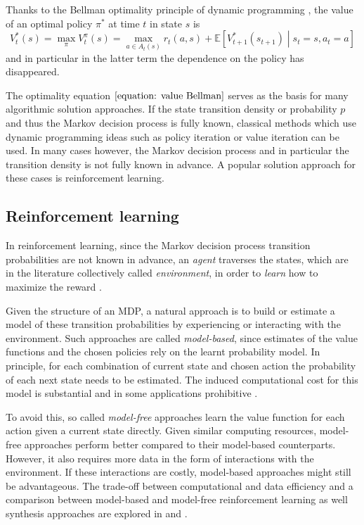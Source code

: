 \documentclass[a4paper,12pt]{article}
\newcommand{\E}{\mathbb{E}}
\begin{document}
Thanks to the Bellman optimality principle of dynamic programming \cite{sutton2018reinforcement}, the value of an optimal policy $\pi^*$ at time $t$ in state $s$ is 
\begin{equation}
    V^*_t(s) = \max_\pi V^\pi_t(s) = \max_{a\in A_t(s)} r_t(a, s) + \E \left[ V^*_{t+1}(s_{t+1}) \middle| s_t = s, a_t = a \right]
    \label{equation: value Bellman}
\end{equation}
and in particular in the latter term the dependence on the policy has disappeared.

The optimality equation $\eqref{equation: value Bellman}$ serves as the basis for many algorithmic solution approaches. If the state transition density or probability $p$ and thus the Markov decision process is fully known, classical methods which use dynamic programming ideas such as policy iteration or value iteration can be used. In many cases however, the Markov decision process and in particular the transition density is not fully known in advance. A popular solution approach for these cases is reinforcement learning.


\subsection{Reinforcement learning}
In reinforcement learning, since the Markov decision process transition probabilities are not known in advance, an \emph{agent} traverses the states, which are in the literature collectively called \emph{environment}, in order to \emph{learn} how to maximize the reward \cite{sutton2018reinforcement}.

Given the structure of an MDP, a natural approach is to build or estimate a model of these transition probabilities by experiencing or interacting with the environment. Such approaches are called \emph{model-based}, since estimates of the value functions and the chosen policies rely on the learnt probability model. In principle, for each combination of current state and chosen action the probability of each next state needs to be estimated. The induced computational cost for this model is substantial and in some applications prohibitive \cite{asadi2016strengths}.

To avoid this, so called \emph{model-free} approaches learn the value function for each action given a current state directly. Given similar computing resources, model-free approaches perform better compared to their model-based counterparts. However, it also requires more data in the form of interactions with the environment. If these interactions are costly, model-based approaches might still be advantageous. 
The trade-off between computational and data efficiency and a comparison between model-based and model-free reinforcement learning as well synthesis approaches are explored in \cite{asadi2016strengths} and \cite{sutton2018reinforcement}.
\end{document}
